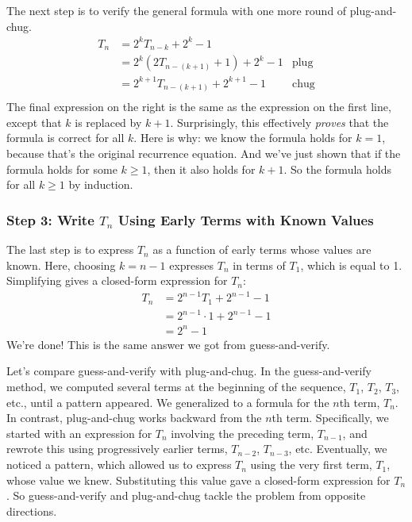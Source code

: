 The next step is to verify the general formula with one more round of plug-and-chug.
\begin{align*}
T_n & = 2^k T_{n-k} + 2^k - 1 \\
  & = 2^k (2 T_{n-(k+1)} + 1) + 2^k - 1 & \text{plug} \\
  & = 2^{k+1} T_{n-(k+1)} + 2^{k+1} - 1 & \text{chug} \\
\end{align*}
The final expression on the right is the same as the expression on the
first line, except that $k$ is replaced by $k+1$.  Surprisingly, this
effectively \emph{proves} that the formula is correct for all $k$.
Here is why: we know the formula holds for $k = 1$, because that's the
original recurrence equation.  And we've just shown that if the
formula holds for some $k \geq 1$, then it also holds for $k + 1$.  So
the formula holds for all $k \geq 1$ by induction.

\subsubsection*{Step 3: Write $T_n$ Using Early Terms with Known Values}

The last step is to express $T_n$ as a function of early terms whose
values are known.  Here, choosing $k = n - 1$ expresses $T_n$ in terms
of $T_1$, which is equal to 1.  Simplifying gives a closed-form
expression for $T_n$:
\begin{align*}
T_n & = 2^{n - 1} T_1 + 2^{n-1} - 1 \\
  & = 2^{n-1} \cdot 1 + 2^{n-1} - 1 \\
  & = 2^n -1
\end{align*}
We're done!  This is the same answer we got from guess-and-verify.

\vspace{1ex}

Let's compare guess-and-verify with plug-and-chug.  In the
guess-and-verify method, we computed several terms at the beginning of
the sequence, $T_1$, $T_2$, $T_3$, etc., until a pattern appeared.  We
generalized to a formula for the $n$th term, $T_n$.  In contrast,
plug-and-chug works backward from the $n$th term.  Specifically, we
started with an expression for $T_n$ involving the preceding term,
$T_{n-1}$, and rewrote this using progressively earlier terms,
$T_{n-2}$, $T_{n-3}$, etc.  Eventually, we noticed a pattern, which
allowed us to express $T_n$ using the very first term, $T_1$, whose
value we knew.  Substituting this value gave a closed-form expression
for $T_n$.  So guess-and-verify and plug-and-chug tackle the problem
from opposite directions.


